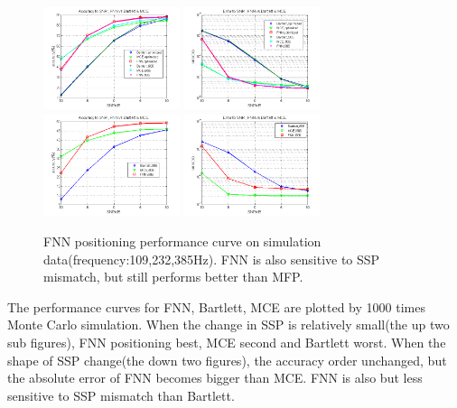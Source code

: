 \begin{figure}
\includegraphics[width=4cm,height=3cm]{figure/Accuracy_to_SNR_FNN_vs_Bartlett_MCE}
\includegraphics[width=4cm,height=3cm]{figure/Error_to_SNR_FNN_vs_Bartlett_MCE}
\includegraphics[width=4cm,height=3cm]{figure/Accuracy_to_SNR_FNN_vs_Bartlett_MCE_i906}
\includegraphics[width=4cm,height=3cm]{figure/Error_to_SNR_FNN_vs_Bartlett_MCE_i906}
\caption{FNN positioning performance curve on simulation data(frequency:109,232,385Hz).
 FNN is also sensitive to SSP mismatch, but still performs better than MFP.
}
\end{figure}

The performance curves for FNN, Bartlett, MCE are plotted by 1000 times Monte Carlo simulation. When the change in SSP is relatively small(the up two sub figures), FNN positioning best, MCE second and Bartlett worst.
When the shape of SSP change(the down two figures), the accuracy order unchanged, but the absolute error of FNN becomes bigger than MCE. FNN is also but less sensitive to SSP mismatch than Bartlett.


